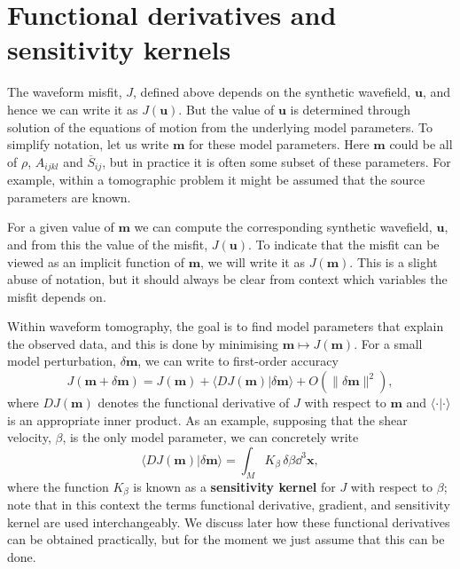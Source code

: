 \section*{Functional derivatives and sensitivity kernels}
The waveform misfit, $J$, defined above depends on the synthetic wavefield, $\mathbf{u}$, and hence we can write it
 as $J(\mathbf{u})$. But the value of $\mathbf{u}$ is determined through solution of the equations of motion from the 
 underlying model parameters. To simplify notation, let us write $\mathbf{m}$ for these model parameters. Here $\mathbf{m}$ could 
 be all of $\rho$, $A_{ijkl}$ and $\overline{S}_{ij}$, but in practice it is often some subset of these parameters. For example, 
 within a tomographic problem it might be assumed that the source parameters are known. 
 
 For a given value of $\mathbf{m}$ we can 
 compute the corresponding synthetic wavefield, $\mathbf{u}$, and from this the value of the misfit, $J(\mathbf{u})$. To indicate that 
 the misfit can be viewed as an implicit function of $\mathbf{m}$, we will write it as $J(\mathbf{m})$. This is a slight abuse of notation, 
 but it should always be clear from context which variables the misfit depends on.

Within waveform tomography, the goal is to find model parameters that explain the observed data, and this is done by 
minimising $\mathbf{m}\mapsto J(\mathbf{m})$. For a small model perturbation, $\delta \mathbf{m}$, we can write to first-order accuracy
\begin{equation}
J(\mathbf{m}+\delta \mathbf{m})=J(\mathbf{m})+\langle DJ(\mathbf{m})|\delta \mathbf{m}\rangle+O(\|\delta \mathbf{m}\|^{2}),
\label{eq:2}
\end{equation}
where $DJ(\mathbf{m})$ denotes the functional derivative of $J$ with respect to $\mathbf{m}$ and $\langle \cdot | \cdot \rangle$ is an 
appropriate inner product. As an example, supposing that the shear velocity, $\beta$, is the only model parameter, we can concretely write
\begin{equation}
\langle DJ(\mathbf{m})|\delta \mathbf{m}\rangle=\int_{M}K_{\beta}\,\delta\beta\dd^{3}\mathbf{x},
\label{eq:3}
\end{equation}
where the function $K_{\beta}$ is known as a \textbf{sensitivity kernel} for $J$ with respect to $\beta$; 
note that in this context the terms functional derivative, gradient, and sensitivity kernel are used interchangeably.
We discuss later how these functional derivatives can be obtained practically, but for the moment we just assume that this can be done.

